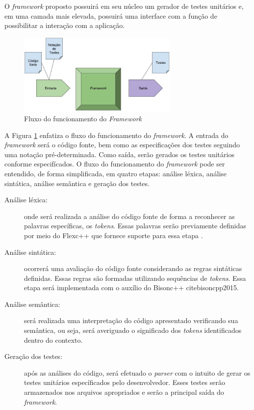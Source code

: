  \par
 \indent O \textit{framework} proposto possuirá em seu núcleo um gerador de testes unitários e, em uma camada mais elevada, possuirá uma interface com a função de possibilitar a interação com a aplicação. 
 
   \begin{figure}[h]
    \centering
    \includegraphics[width=0.7\textwidth]{figuras/entradasesaidas.jpg}
    \caption{Fluxo do funcionamento do \textit{Framework}}
    \label{fig:entradasesaidas}
 \end{figure}
 
 \par
\indent A Figura \ref{fig:entradasesaidas} enfatiza o fluxo do funcionamento do \textit{framework}. A entrada do \textit{framework} será o código fonte, bem como as especificações dos testes seguindo uma notação pré-determinada. Como saída, serão gerados os testes unitários conforme especifícados. O fluxo do funcionamento do \textit{framework} pode ser entendido, de forma simplificada, em quatro etapas: análise léxica, análise sintática, análise semântica e geração dos testes. 
 \begin{description}
 \item[Análise léxica:] onde será realizada a análise do código fonte de forma a reconhecer as palavras específicas, os \textit{tokens}. Essas palavras serão previamente definidas por meio do Flexc++ que fornece suporte para essa etapa \cite{flexcpp2015}.
 \item[Análise sintática:] ocorrerá uma avaliação do código fonte considerando as regras sintáticas definidas. Essas regras são formadas utilizando sequências de \textit{tokens}. Essa etapa será implementada com o auxílio do Bisonc++ cite{bisoncpp2015}.
 \item[Análise semântica:] será realizada uma interpretação do código apresentado verificando sua semântica, ou seja, será averiguado o significado dos \textit{tokens} identificados dentro do contexto.
  \item[Geração dos testes:] após as análises do código, será efetuado o \textit{parser} com o intuito de gerar os testes unitários específicados pelo desenvolvedor. Esses testes serão armazenados nos arquivos apropriados e serão a principal saída do \textit{framework}.
 \end{description}
 
